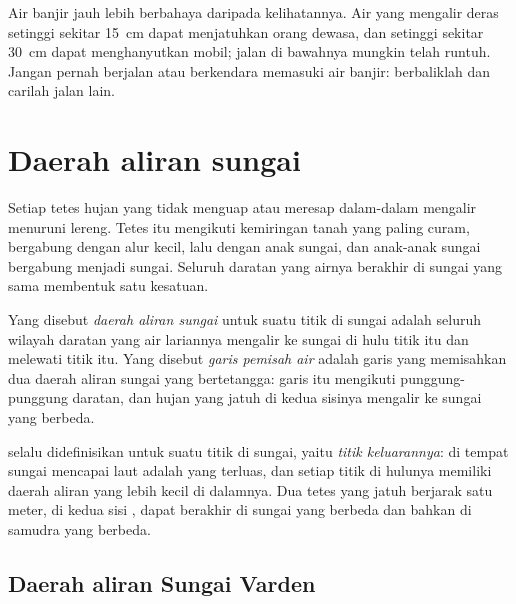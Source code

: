 \begin{safety}
Air banjir jauh lebih berbahaya daripada kelihatannya. Air yang mengalir deras
setinggi sekitar \qty{15}{cm} dapat menjatuhkan orang dewasa, dan setinggi
sekitar \qty{30}{cm} dapat menghanyutkan mobil; jalan di bawahnya mungkin
telah runtuh. Jangan pernah berjalan atau berkendara memasuki air banjir:
berbaliklah dan carilah jalan lain.
\end{safety}

\section{Daerah aliran sungai}

Setiap tetes hujan yang tidak menguap atau meresap dalam-dalam mengalir
menuruni lereng. Tetes itu mengikuti kemiringan tanah yang paling curam,
bergabung dengan alur kecil, lalu dengan anak sungai, dan anak-anak sungai
bergabung menjadi sungai. Seluruh daratan yang airnya berakhir di sungai yang
sama membentuk satu kesatuan.

\begin{definition}\label{def:g10:drainage-basins:drainage-basin}
Yang disebut \emph{daerah aliran sungai} untuk
suatu titik di sungai adalah seluruh wilayah daratan yang air lariannya
mengalir ke sungai di hulu titik itu dan melewati titik itu. Yang disebut
\emph{garis pemisah air} adalah garis yang memisahkan
dua daerah aliran sungai yang bertetangga: garis itu mengikuti punggung-punggung
daratan, dan hujan yang jatuh di kedua sisinya mengalir ke sungai yang
berbeda.
\end{definition}

 selalu didefinisikan untuk suatu titik di sungai, yaitu
\emph{titik keluarannya}:  di tempat sungai mencapai laut
adalah yang terluas, dan setiap titik di hulunya memiliki daerah aliran yang
lebih kecil di dalamnya. Dua tetes yang jatuh berjarak satu meter, di kedua
sisi , dapat berakhir di sungai yang berbeda dan bahkan di
samudra yang berbeda.

\subsection*{Daerah aliran Sungai Varden}

